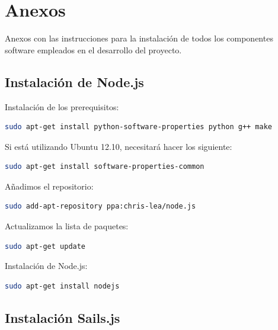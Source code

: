 

\chapter{Anexos}
\label{chap:anexos}

Anexos con las instrucciones para la instalación de todos los componentes software empleados en el desarrollo del proyecto.

\section{Instalación de Node.js}


Instalación de los prerequisitos:

\begin{lstlisting}[language=bash]
sudo apt-get install python-software-properties python g++ make
\end{lstlisting}


Si está utilizando Ubuntu 12.10, necesitará hacer los siguiente:

\begin{lstlisting}[language=bash]
sudo apt-get install software-properties-common
\end{lstlisting}


Añadimos el repositorio:

\begin{lstlisting}[language=bash]
sudo add-apt-repository ppa:chris-lea/node.js
\end{lstlisting}

Actualizamos la lista de paquetes:

\begin{lstlisting}[language=bash]
sudo apt-get update
\end{lstlisting}

Instalación de  Node.js:

\begin{lstlisting}[language=bash]
sudo apt-get install nodejs
\end{lstlisting}




\section{Instalación Sails.js}

